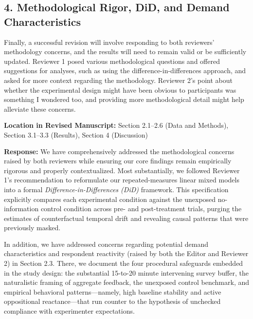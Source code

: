 \documentclass[11pt, letterpaper]{article}
\begin{document}
\vspace{10pt}

\subsection*{4. Methodological Rigor, DiD, and Demand Characteristics}

\begin{reviewercomment}
Finally, a successful revision will involve responding to both reviewers' methodology concerns, and the results will need to remain valid or be sufficiently updated. Reviewer 1 posed various methodological questions and offered suggestions for analyses, such as using the difference-in-differences approach, and asked for more context regarding the methodology. Reviewer 2's point about whether the experimental design might have been obvious to participants was something I wondered too, and providing more methodological detail might help alleviate these concerns.
\end{reviewercomment}

\textbf{Location in Revised Manuscript:} Section 2.1--2.6 (Data and Methods), Section 3.1--3.3 (Results), Section 4 (Discussion)

\textbf{Response:}
We have comprehensively addressed the methodological concerns raised by both reviewers while ensuring our core findings remain empirically rigorous and properly contextualized. Most substantially, we followed Reviewer 1's recommendation to reformulate our repeated-measures linear mixed models into a formal \textit{Difference-in-Differences (DiD)} framework. This specification explicitly compares each experimental condition against the unexposed no-information control condition across pre- and post-treatment trials, purging the estimates of counterfactual temporal drift and revealing causal patterns that were previously masked.

In addition, we have addressed concerns regarding potential demand characteristics and respondent reactivity (raised by both the Editor and Reviewer 2) in Section 2.3. There, we document the four procedural safeguards embedded in the study design: the substantial 15-to-20 minute intervening survey buffer, the naturalistic framing of aggregate feedback, the unexposed control benchmark, and empirical behavioral patterns---namely, high baseline stability and active oppositional reactance---that run counter to the hypothesis of unchecked compliance with experimenter expectations.

\newpage
\end{document}
